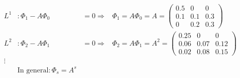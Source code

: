 \documentclass[a4paper]{scrartcl}
\begin{document}
\begin{enumerate}
\begin{solution}
\begin{align}
                      L^1 & : \Phi_1 - A \Phi_0                          & = 0 \Rightarrow   & \Phi_1 = A \Phi_0 = A = \begin{pmatrix}0.5&0&0\\0.1&0.1&0.3\\0&0.2&0.3 \end{pmatrix}\nonumber            \\
                      L^2 & : \Phi_2 - A \Phi_1                          & = 0 \Rightarrow   & \Phi_2 = A \Phi_1 = A^2 = \begin{pmatrix}0.25&0&0\\0.06&0.07&0.12\\0.02&0.08&0.15 \end{pmatrix}\nonumber \\
                      \vdots\nonumber                                                                                                                                                                   \\
                          & \text{In general}: \Phi_s = A^s \label{allg}
                  \end{align}
              \end{solution}
    \end{enumerate}
    
    
    \newpage
\end{document}
